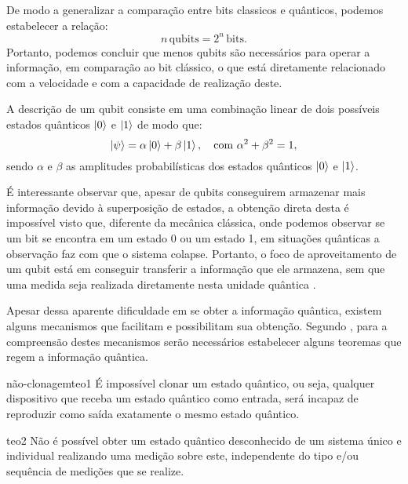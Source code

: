 \documentclass[12pt,oneside,brazil,hidelinks,article,sumario=tradicional,a4paper]{abntex2}
\begin{document}
De modo a generalizar a comparação entre bits classicos e quânticos, podemos estabelecer a relação:
\begin{equation} \label{bitvsqubit}
n\, \text{qubits} = 2^{n}\,\text{bits}.
\end{equation}
Portanto, podemos concluir que menos qubits são necessários para operar a informação, em comparação ao bit clássico, o que está diretamente relacionado com a velocidade e com a capacidade de realização deste.

A descrição de um qubit consiste em uma combinação linear de dois possíveis estados quânticos $\ket{0}$ e $\ket{1}$ de modo que:
\begin{equation} \label{comblinearqubit}
 \ket{\psi} = \alpha \ket{0} + \beta \ket{1}, \quad \text{com } \alpha^{2} + \beta^{2} = 1,
\end{equation}
sendo $\alpha$ e $\beta$ as amplitudes probabilísticas dos estados quânticos $\ket{0}$ e $\ket{1}$.

É interessante observar que, apesar de qubits conseguirem armazenar mais informação devido à superposição de estados, a obtenção direta desta é impossível visto que, diferente da mecânica clássica, onde podemos observar se um bit se encontra em um estado 0 ou um estado 1, em situações quânticas a observação faz com que o sistema colapse. Portanto, o foco de aproveitamento de um qubit está em conseguir transferir a informação que ele armazena, sem que uma medida seja realizada diretamente nesta unidade quântica \cite{chuang}.

Apesar dessa aparente dificuldade em se obter a informação quântica, existem alguns mecanismos que facilitam e possibilitam sua obtenção. Segundo \textcite{materialdidaticomecquantica}, para a compreensão destes mecanismos serão necessários estabelecer alguns teoremas que regem a informação quântica.

\begin{theo}{não-clonagem}{teo1}
É impossível clonar um estado quântico, ou seja, qualquer dispositivo que receba um estado quântico como entrada, será incapaz de reproduzir como saída exatamente o mesmo estado quântico.
\end{theo}

\begin{theo}{}{teo2}
Não é possível obter um estado quântico desconhecido de um sistema único e individual realizando uma medição sobre este, independente do tipo e/ou sequência de medições que se realize.
\end{theo}
\end{document}
